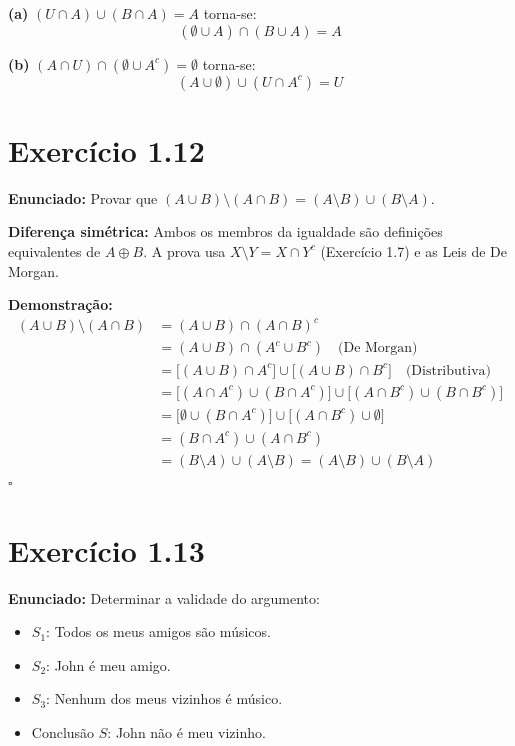 \documentclass[12pt,a4paper]{article}
\begin{document}
\textbf{(a)} $(U \cap A) \cup (B \cap A) = A$ \quad torna-se:
\[
(\emptyset \cup A) \cap (B \cup A) = A
\]

\textbf{(b)} $(A \cap U) \cap (\emptyset \cup A^c) = \emptyset$ \quad torna-se:
\[
(A \cup \emptyset) \cup (U \cap A^c) = U
\]

\section*{Exercício 1.12}

\textbf{Enunciado:} Provar que $(A \cup B) \setminus (A \cap B) = (A \setminus B) \cup (B \setminus A)$.

\begin{teoribox}
\textbf{Diferença simétrica:} Ambos os membros da igualdade são definições equivalentes de $A \oplus B$. A prova usa $X \setminus Y = X \cap Y^c$ (Exercício 1.7) e as Leis de De Morgan.
\end{teoribox}

\textbf{Demonstração:}
\begin{align*}
(A \cup B) \setminus (A \cap B) &= (A \cup B) \cap (A \cap B)^c \\
&= (A \cup B) \cap (A^c \cup B^c) \quad \text{(De Morgan)} \\
&= \bigl[(A \cup B) \cap A^c\bigr] \cup \bigl[(A \cup B) \cap B^c\bigr] \quad \text{(Distributiva)} \\
&= \bigl[(A \cap A^c) \cup (B \cap A^c)\bigr] \cup \bigl[(A \cap B^c) \cup (B \cap B^c)\bigr] \\
&= \bigl[\emptyset \cup (B \cap A^c)\bigr] \cup \bigl[(A \cap B^c) \cup \emptyset\bigr] \\
&= (B \cap A^c) \cup (A \cap B^c) \\
&= (B \setminus A) \cup (A \setminus B) = (A \setminus B) \cup (B \setminus A)
\end{align*}
\hfill$\square$

\section*{Exercício 1.13}

\textbf{Enunciado:} Determinar a validade do argumento:
\begin{itemize}
  \item $S_1$: Todos os meus amigos são músicos.
  \item $S_2$: John é meu amigo.
  \item $S_3$: Nenhum dos meus vizinhos é músico.
  \item Conclusão $S$: John não é meu vizinho.
\end{itemize}
\end{document}
